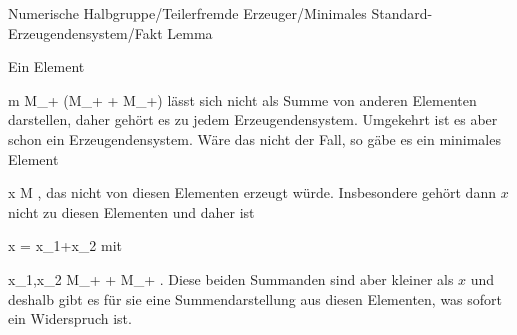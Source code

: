{Numerische Halbgruppe/Teilerfremde Erzeuger/Minimales Standard-Erzeugendensystem/Fakt}
{Lemma}
{}
{



\faktsituation {}
\faktzusatz {}
\faktzusatz {}





}
{





Ein Element

\mavergleichskette
{\vergleichskette
{ m
}
{ \in }{ M_+ \setminus (M_+ + M_+)
}
{  }{
}
{    }{
}
{   }{
}
}
{}{}{}
lässt sich nicht als Summe von anderen Elementen darstellen, daher gehört es zu jedem Erzeugendensystem. Umgekehrt ist es aber schon ein Erzeugendensystem. Wäre das nicht der Fall, so gäbe es ein minimales Element

\mavergleichskette
{\vergleichskette
{ x
}
{ \in }{ M
}
{  }{
}
{    }{
}
{   }{
}
}
{}{}{,}
das nicht von diesen Elementen erzeugt würde. Insbesondere gehört dann $x$ nicht zu diesen Elementen und daher ist

\mavergleichskette
{\vergleichskette
{ x
}
{ = }{ x_1+x_2
}
{  }{
}
{    }{
}
{   }{
}
}
{}{}{}
mit

\mavergleichskette
{\vergleichskette
{ x_1,x_2
}
{ \in }{ M_+ + M_+
}
{  }{
}
{    }{
}
{   }{
}
}
{}{}{.}
Diese beiden Summanden sind aber kleiner als $x$ und deshalb gibt es für sie eine Summendarstellung aus diesen Elementen, was sofort ein Widerspruch ist.




}






